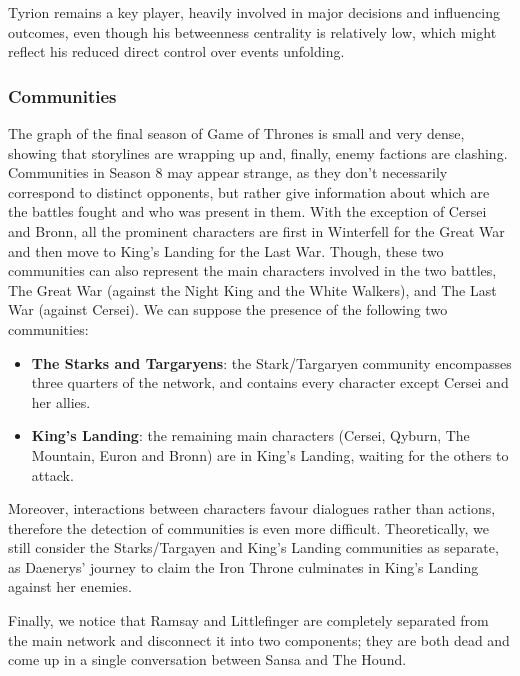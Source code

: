 \documentclass[10pt,twocolumn,letterpaper]{article}
\begin{document}
Tyrion remains a key player, heavily involved in major decisions and influencing outcomes, even though his betweenness centrality is relatively low, which might reflect his reduced direct control over events unfolding.


\subsubsection{Communities}

The graph of the final season of Game of Thrones is small and very dense, showing that storylines are wrapping up and, finally, enemy factions are clashing. Communities in Season 8 may appear strange, as they don't necessarily correspond to distinct opponents, but rather give information about which are the battles fought and who was present in them. With the exception of Cersei and Bronn, all the prominent characters are first in Winterfell for the Great War and then move to King’s Landing for the Last War. Though, these two communities can also represent the main characters involved in the two battles, The Great War (against the Night King and the White Walkers), and The Last War (against Cersei). 
We can suppose the presence of the following two communities:
\begin{itemize}
    \item \textbf{The Starks and Targaryens}: the Stark/Targaryen community encompasses three quarters of the network, and contains every character except Cersei and her allies. 
    \item \textbf{King's Landing}: the remaining main characters (Cersei, Qyburn, The Mountain, Euron and Bronn) are in King's Landing, waiting for the others to attack.
\end{itemize}

Moreover, interactions between characters favour dialogues rather than actions, therefore the detection of communities is even more difficult.
Theoretically, we still consider the Starks/Targayen and King's Landing communities as separate, as Daenerys' journey to claim the Iron Throne culminates in King's Landing against her enemies.

Finally, we notice that Ramsay and Littlefinger are completely separated from the main network and disconnect it into two components; they are both dead and come up in a single conversation between Sansa and The Hound.
\end{document}
